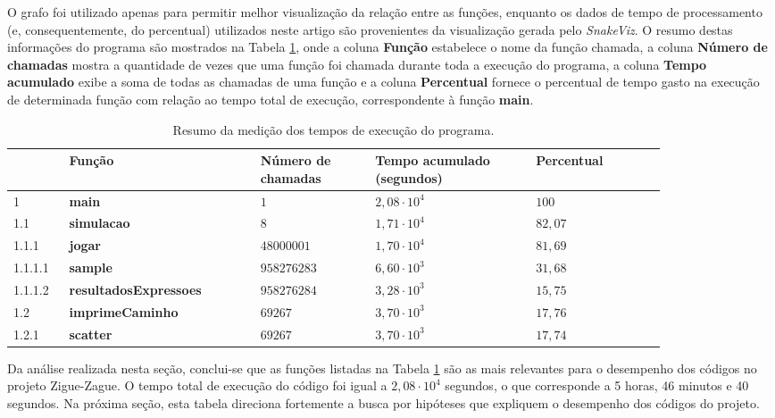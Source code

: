 \documentclass[12pt]{article}
\begin{document}
O grafo foi utilizado apenas para permitir melhor visualização da relação entre as funções, enquanto os dados de tempo de processamento (e, consequentemente, do percentual) utilizados neste artigo são provenientes da visualização gerada pelo \textit{SnakeViz}. O resumo destas informações do programa são mostrados na Tabela \ref{tab}, onde a coluna \textbf{Função} estabelece o nome da função chamada, a coluna \textbf{Número de chamadas} mostra a quantidade de vezes que uma função foi chamada durante toda a execução do programa, a coluna \textbf{Tempo acumulado} exibe a soma de todas as chamadas de uma função e a coluna \textbf{Percentual} fornece o percentual de tempo gasto na execução de determinada função com relação ao tempo total de execução, correspondente à função \textbf{main}.

\begin{table}[ht!]
	\centering
	\caption{Resumo da medição dos tempos de execução do programa.}
	\label{tab}
	\begin{tabular}{|m{0.07\linewidth}|m{0.25\linewidth}|m{0.15\linewidth}|m{0.21\linewidth}|m{0.17	\linewidth}|}
		\hline
		 & \textbf{Função} & \textbf{Número de chamadas} & \textbf{Tempo acumulado (segundos)} & \textbf{Percentual}\\
		\hline \hline
		1 & \textbf{main} & $1$	& $2,08 \cdot 10^4$ & $100$ \\
		\hline
		1.1 & \textbf{simulacao} & $8$	& $1,71 \cdot 10^4$  & $82,07$ \\
		\hline
		1.1.1& \textbf{jogar} & $48000001$ & $1,70 \cdot 10^4$ & $81,69$ \\
		\hline
		1.1.1.1 & \textbf{sample} & $958276283$ & $6,60 \cdot 10^3$ & $31,68$ \\
		\hline
		1.1.1.2 & \textbf{resultadosExpressoes} & $958276284$ & $3,28 \cdot 10^3$ & $15,75$ \\
		\hline
		1.2 & \textbf{imprimeCaminho} & $69267$   & $3,70 \cdot 10^3$ & $17,76$ \\
		\hline
		1.2.1 & \textbf{scatter} & $69267$ & $3,70 \cdot 10^3$ & $17,74$ \\
		\hline
	\end{tabular}
\end{table}

Da análise realizada nesta seção, conclui-se que as funções listadas na Tabela \ref{tab} são as mais relevantes para o desempenho dos códigos no projeto Zigue-Zague. O tempo total de execução do código foi igual a $2,08 \cdot 10^4$ segundos, o que corresponde a 5 horas, 46 minutos e 40 segundos. Na próxima seção, esta tabela direciona fortemente a busca por hipóteses que expliquem o desempenho dos códigos do projeto.
\end{document}
